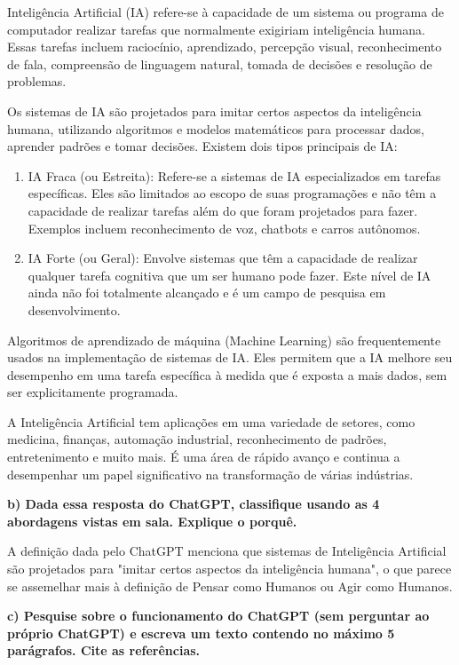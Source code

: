 Inteligência Artificial (IA) refere-se à capacidade de um sistema ou programa de computador realizar tarefas que normalmente exigiriam inteligência humana. Essas tarefas incluem raciocínio, aprendizado, percepção visual, reconhecimento de fala, compreensão de linguagem natural, tomada de decisões e resolução de problemas.

Os sistemas de IA são projetados para imitar certos aspectos da inteligência humana, utilizando algoritmos e modelos matemáticos para processar dados, aprender padrões e tomar decisões. Existem dois tipos principais de IA:

\begin{enumerate}
    \item IA Fraca (ou Estreita): Refere-se a sistemas de IA especializados em tarefas específicas. Eles são limitados ao escopo de suas programações e não têm a capacidade de realizar tarefas além do que foram projetados para fazer. Exemplos incluem reconhecimento de voz, chatbots e carros autônomos.
    \item IA Forte (ou Geral): Envolve sistemas que têm a capacidade de realizar qualquer tarefa cognitiva que um ser humano pode fazer. Este nível de IA ainda não foi totalmente alcançado e é um campo de pesquisa em desenvolvimento.
\end{enumerate}
    
Algoritmos de aprendizado de máquina (Machine Learning) são frequentemente usados na implementação de sistemas de IA. Eles permitem que a IA melhore seu desempenho em uma tarefa específica à medida que é exposta a mais dados, sem ser explicitamente programada.

A Inteligência Artificial tem aplicações em uma variedade de setores, como medicina, finanças, automação industrial, reconhecimento de padrões, entretenimento e muito mais. É uma área de rápido avanço e continua a desempenhar um papel significativo na transformação de várias indústrias.

\begin{adjustwidth}{1em}{}
\textbf{b) Dada essa resposta do ChatGPT, classifique usando as 4 abordagens vistas em
sala. Explique o porquê.}
\end{adjustwidth}

A definição dada pelo ChatGPT menciona que sistemas de Inteligência Artificial são projetados para "imitar certos aspectos da inteligência humana", o que parece se assemelhar mais à definição de Pensar como Humanos ou Agir como Humanos.

\begin{adjustwidth}{1em}{}
\textbf{c) Pesquise sobre o funcionamento do ChatGPT (sem perguntar ao próprio
ChatGPT) e escreva um texto contendo no máximo 5 parágrafos. Cite as referências.}
\end{adjustwidth}

